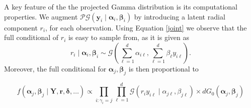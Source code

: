 A key feature of the the projected Gamma distribution is its computational properties. We augment  $\mathcal{PG}(\bm{y}_i\mid\bm{\alpha}_i,\bm{\beta}_i) $ by introducing a latent radial component $r_i$, for each observation. Using Equation \eqref{joint} we observe that the 
full conditional of $r_i$ is easy to sample from, as it is given as
\begin{equation}
    r_i\mid\bm{\alpha}_i,\bm{\beta}_i \sim \mathcal{G}\left(\sum_{\ell = 1}^d\alpha_{i\ell}, \sum_{\ell = 1}^d\beta_{\ell} y_{i\ell}\right).
\end{equation}
Moreover,  the full conditional for $\bm{\alpha}_j,\bm{\beta}_j$ is then proportional to

\begin{equation}
    f(\bm{\alpha}_j,\bm{\beta}_j\mid \bm{Y},\bm{r},\bm{\delta},\ldots) \propto \prod_{i:\gamma_i = j}\prod_{\ell = 1}^d\mathcal{G}\left(r_iy_{i\ell}\mid\alpha_{j\ell},\beta_{j\ell}\right) \times dG_0(\bm{\alpha}_j,\bm{\beta}_j)
\end{equation}


